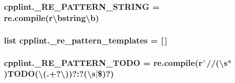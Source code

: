 \subsubsection[{\texorpdfstring{\+\_\+\+R\+E\+\_\+\+P\+A\+T\+T\+E\+R\+N\+\_\+\+S\+T\+R\+I\+NG}{_RE_PATTERN_STRING}}]{\setlength{\rightskip}{0pt plus 5cm}cpplint.\+\_\+\+R\+E\+\_\+\+P\+A\+T\+T\+E\+R\+N\+\_\+\+S\+T\+R\+I\+NG = re.\+compile(r\textquotesingle{}\textbackslash{}bstring\textbackslash{}b\textquotesingle{})\hspace{0.3cm}{\ttfamily [private]}}\hypertarget{namespacecpplint_aa9034b4a8066397d074296c6c97b2c01}{}\label{namespacecpplint_aa9034b4a8066397d074296c6c97b2c01}
\subsubsection[{\texorpdfstring{\+\_\+re\+\_\+pattern\+\_\+templates}{_re_pattern_templates}}]{\setlength{\rightskip}{0pt plus 5cm}list cpplint.\+\_\+re\+\_\+pattern\+\_\+templates = \mbox{[}$\,$\mbox{]}\hspace{0.3cm}{\ttfamily [private]}}\hypertarget{namespacecpplint_af915642b63638b43de40fda5bc97760b}{}\label{namespacecpplint_af915642b63638b43de40fda5bc97760b}
\subsubsection[{\texorpdfstring{\+\_\+\+R\+E\+\_\+\+P\+A\+T\+T\+E\+R\+N\+\_\+\+T\+O\+DO}{_RE_PATTERN_TODO}}]{\setlength{\rightskip}{0pt plus 5cm}cpplint.\+\_\+\+R\+E\+\_\+\+P\+A\+T\+T\+E\+R\+N\+\_\+\+T\+O\+DO = re.\+compile(r\textquotesingle{}$^\wedge$//(\textbackslash{}s$\ast$)T\+O\+DO(\textbackslash{}(.+?\textbackslash{}))?\+:?(\textbackslash{}s$\vert$\$)?\textquotesingle{})\hspace{0.3cm}{\ttfamily [private]}}\hypertarget{namespacecpplint_a055d2ef16d7385daba02715dc5da4b70}{}\label{namespacecpplint_a055d2ef16d7385daba02715dc5da4b70}
